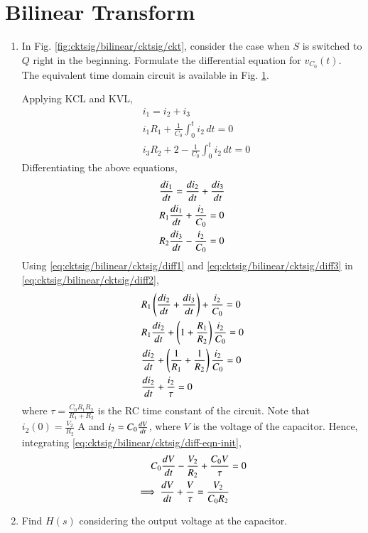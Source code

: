 \documentclass[journal,12pt,twocolumn]{IEEEtran}
\renewcommand\thesection{\arabic{section}}
\begin{document}
\section{Bilinear Transform}
\begin{enumerate}[label=\arabic*.,ref=\thesection.\theenumi]
\item In Fig. \ref{fig:cktsig/bilinear/cktsig/ckt}, consider the case when $S$ is switched to 
	$Q$ right in the beginning. Formulate the differential equation for $v_{C_0}(t)$.
\\
\solution The equivalent time domain circuit is available in Fig. 
\ref{fig:cktsig/bilinear/cktsig/tckt-q4}.
%	
\begin{figure}[!htb]
	\centering

    \centering
\caption{}
\label{fig:cktsig/bilinear/cktsig/tckt-q4}
\end{figure}
%
Applying KCL and KVL,
\begin{align}
    &i_1 = i_2 + i_3 \\
    &i_1R_1 + \frac{1}{C_0}\int_0^ti_2\, dt = 0 \\
    &i_3R_2 + 2 - \frac{1}{C_0}\int_0^ti_2\, dt = 0
\end{align}
Differentiating the above equations,
\begin{align}
    &\diff{i_1}{t} = \diff{i_2}{t} + \diff{i_3}{t} \label{eq:cktsig/bilinear/cktsig/diff1}\\
    &R_1\diff{i_1}{t} + \frac{i_2}{C_0} = 0 \label{eq:cktsig/bilinear/cktsig/diff2}\\
    &R_2\diff{i_3}{t} - \frac{i_2}{C_0} = 0 \label{eq:cktsig/bilinear/cktsig/diff3}
\end{align}
Using \eqref{eq:cktsig/bilinear/cktsig/diff1} and \eqref{eq:cktsig/bilinear/cktsig/diff3} in \eqref{eq:cktsig/bilinear/cktsig/diff2},
\begin{align}
    &R_1\brak{\diff{i_2}{t} + \diff{i_3}{t}} + \frac{i_2}{C_0} = 0 \\
    &R_1\diff{i_2}{t} + \brak{1 + \frac{R_1}{R_2}}\frac{i_2}{C_0} = 0 \\
    &\diff{i_2}{t} + \brak{\frac{1}{R_1} + \frac{1}{R_2}}\frac{i_2}{C_0} = 0 \\
    &\diff{i_2}{t} + \frac{i_2}{\tau} = 0
    \label{eq:cktsig/bilinear/cktsig/diff-eqn-init}
\end{align}
where $\tau = \frac{C_0R_1R_2}{R_1 + R_2}$ is the RC time 
constant of the circuit. Note that $i_2(0) = \frac{V_2}{R_2}$ A and 
$i_2 = C_0\frac{d{V}}{d{t}}$, where $V$ is the voltage of the capacitor. 
Hence, integrating \eqref{eq:cktsig/bilinear/cktsig/diff-eqn-init},
\begin{align}
    C_0\diff{V}{t} - \frac{V_2}{R_2} + \frac{C_0V}{\tau} &= 0 \\
    \implies \diff{V}{t} + \frac{V}{\tau} = \frac{V_2}{C_0R_2}
    \label{eq:cktsig/bilinear/cktsig/diff-eqn}
\end{align}
\item Find $H(s)$ considering the output voltage at the capacitor.


\end{enumerate}
\end{document}
